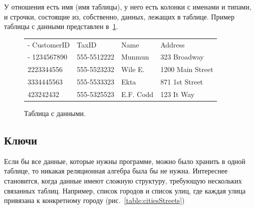 \documentclass[a5paper]{article}
\begin{document}
У отношения есть имя (имя таблицы), у него есть колонки с именами и типами, и строчки, состоящие из, собственно, данных, лежащих в таблице. Пример таблицы с данными представлен в~\ref{table:tableWithData}.

\begin{figure}
	\begin{center}
		\begin{tabu} {| X[0.9 l p] | X[1 l p] | X[1 l p] | X[1 l p] |}
			\tabucline-
			CustomerID       & TaxID        & Name       & Address           \\
			\tabucline-
			\everyrow{\tabucline-}
			1234567890       & 555-5512222  & Munmun     & 323 Broadway      \\
			2223344556       & 555-5523232  & Wile E.    & 1200 Main Street  \\
			3334445563       & 555-5533323  & Ekta       & 871 1st Street    \\
			423242432        & 555-5325523  & E.F. Codd  & 123 It Way        \\
		\end{tabu}
	\end{center}
	\caption{Таблица с данными.}
	\label{table:tableWithData}
\end{figure}

\subsection{Ключи}

Если бы все данные, которые нужны программе, можно было хранить в одной таблице, то никакая реляционная алгебра была бы не нужна. Интереснее становится, когда данные имеют сложную структуру, требующую нескольких связанных таблиц. Например, список городов и список улиц, где каждая улица привязана к конкретному городу (рис.~\ref{table:citiesStreets})
\end{document}

